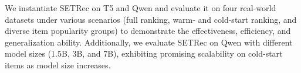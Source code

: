 We instantiate SETRec on T5 and Qwen and evaluate it on four real-world datasets under various scenarios (\eg full ranking, warm- and cold-start ranking, and diverse item popularity groups) to demonstrate the effectiveness, efficiency, and generalization ability. 
Additionally, we evaluate SETRec on Qwen with different model sizes (\ie 1.5B, 3B, and 7B), exhibiting promising scalability on cold-start items as model size increases. 


